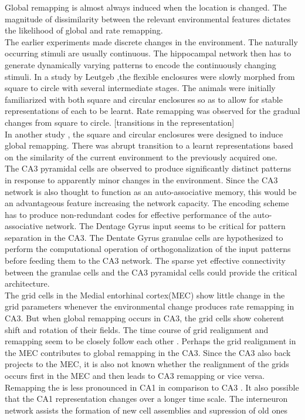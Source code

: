 Global remapping is almost always induced when the location is changed. The magnitude of dissimilarity between the relevant environmental features dictates the likelihood of global and rate remapping. \\
The earlier experiments made discrete changes in the environment. The naturally occurring stimuli are usually continuous. The hippocampal network then has to generate dynamically varying patterns to encode the continuously changing stimuli. In a study by Leutgeb \cite{Leutgeb2005},the flexible enclosures were slowly morphed from square to circle with several intermediate stages. The animals were initially familiarized with both square and circular enclosures so as to allow for stable representations of each to be learnt. Rate remapping was observed for the gradual changes from square to circle.  [transitions in the representation]\\
In another study \cite{Wills2005}, the square and circular enclosures were designed to induce global remapping. There was abrupt transition to a learnt representations based on the similarity of the current environment to the previously acquired one. \\
The CA3 pyramidal cells are observed to produce significantly distinct patterns in response to apparently minor changes in the environment. Since the CA3 network is also thought to function as an auto-associative memory, this would be an advantageous feature increasing the network capacity. The encoding scheme has to produce non-redundant codes for effective performance of the auto-associative network. The Dentage Gyrus input seems to be critical for pattern separation in the CA3. The Dentate Gyrus granulae cells are hypothesized to perform the computational operation of orthogonalization of the input patterns before feeding them to the CA3 network. The sparse yet effective connectivity between the granulae cells and the CA3 pyramidal cells could provide the critical architecture.\\ The grid cells in the Medial entorhinal cortex(MEC) show little change in the grid parameters whenever the environmental change produces rate remapping in CA3. But when global remapping occurs in CA3, the grid cells show coherent shift and rotation of their fields. The time course of grid realignment and remapping seem to be closely follow each other \cite{Fyhn2007}. Perhaps the grid realignment in the MEC contributes to global remapping in the CA3. Since the CA3 also back projects to the MEC, it is also not known whether the realignment of the grids occurs first in the MEC and then leads to CA3 remapping or vice versa.\\ 
Remapping the is less pronounced in CA1 in comparison to CA3 \cite{Leutgeb2005a, Leutgeb2004}. It also possible that the CA1 representation changes over a longer time scale. The interneuron network assists the formation of new cell assemblies and supression of old ones \cite{Dupret2013}

